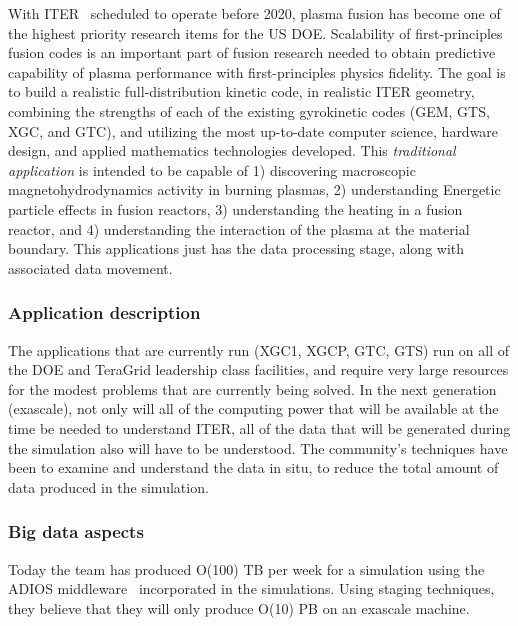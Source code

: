 With ITER~\cite{iter} scheduled to operate before 2020, plasma fusion has become
one of the highest priority research items for the US DOE. Scalability of
first-principles fusion codes is an important part of fusion research
needed to obtain predictive capability of plasma performance with
first-principles physics fidelity. The goal is to build a realistic
full-distribution kinetic code, in realistic ITER geometry, combining
the strengths of each of the existing gyrokinetic codes (GEM, GTS,
XGC, and GTC), and utilizing the most up-to-date computer science,
hardware design, and applied mathematics technologies developed. This
{\em traditional application} is intended to be capable of 1) discovering
macroscopic magnetohydrodynamics activity in burning plasmas, 2)
understanding Energetic particle effects in fusion reactors, 3)
understanding the heating in a fusion reactor, and 4) understanding the
interaction of the plasma at the material boundary. This applications just
has the data processing stage, along with associated data movement.

\subsubsection*{Application description}


The applications that are currently run (XGC1, XGCP, GTC, GTS) run on all of the DOE and TeraGrid leadership class facilities, and require very large resources for the modest problems that are currently being solved. In the next generation (exascale), not only will all of the computing power that will be available at the time be needed to understand ITER, all of the data that will be generated during the simulation also will have to be understood. The community's techniques have been to examine and understand the data in situ, to reduce the total amount of data produced in the simulation.


 \subsubsection*{Big data aspects}



Today the team has produced O(100) TB per week for a simulation using the ADIOS middleware~\cite{adios} incorporated in the simulations. Using staging techniques, they believe that they will only produce O(10) PB on an exascale machine.

